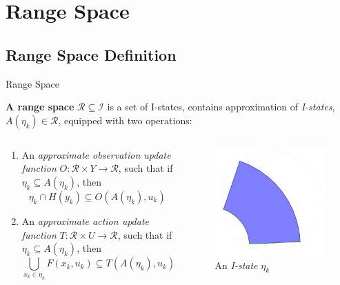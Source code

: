 \documentclass[10pt]{beamer}
\begin{document}
\section[Range Space]{Range Space}
\subsection[Range Space Definition]{Range Space Definition}
\begin{frame}{Range Space}
  \begin{definition}{\textbf{A range space}}
    $\mathcal{R} \subseteq \mathcal{I}$ is a set of I-states, contains
    approximation of \emph{I-states}, $A(\eta_k) \in \mathcal{R}$, equipped with
    two operations:
  \end{definition}
  \begin{columns}
    \begin{column}{.5\textwidth}
      \begin{enumerate}
      \item An \emph{approximate observation update function} $O: \mathcal{R} \times
        Y \to \mathcal{R}$, such that if $\eta_k \subseteq A(\eta_k)$, then
        $$\eta_k \cap H(y_k) \subseteq O(A(\eta_k), u_k)$$
      \item An \emph{approximate action update function} $T: \mathcal{R} \times U \to
        \mathcal{R}$, such that if $\eta_k \subseteq A(\eta_k)$, then
        $$\bigcup_{x_k \in \eta_k} F(x_k, u_k) \subseteq T(A(\eta_k), u_k)$$
      \end{enumerate}
    \end{column}
    \begin{column}{.4\textwidth}
    \begin{figure}
      \includegraphics[scale=0.3]{figs/norangespace.jpg}
      \caption{An \emph{I-state} $\eta_k$}
    \end{figure}
  \end{column}
\end{columns}
\end{frame}
\end{document}
